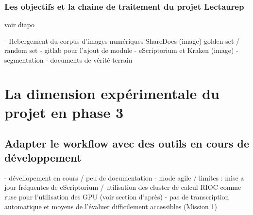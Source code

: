 


\subsubsection{Les objectifs et la chaine de traitement du projet Lectaurep}



voir diapo 

- Hebergement du corpus d'images numériques ShareDocs (image) golden set / random set
- gitlab pour l'ajout de module
- eScriptorium et Kraken (image)
- segmentation
- documents de vérité terrain


\section{La dimension expérimentale du projet en phase 3}

\subsection{Adapter le workflow avec des outils en cours de développement}

- dévellopement en cours / peu de documentation
- mode agile / limites : mise a jour fréquentes de eScriptorium / utilisation des cluster de calcul RIOC comme ruse pour l'utilisation des GPU (voir section d'après)
- pas de transcription automatique et moyens de l'évaluer difficilement accessibles (Mission 1) 


